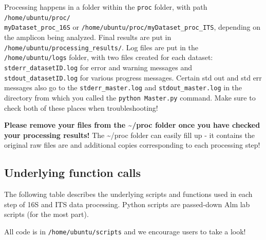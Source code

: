 \documentclass[11pt, oneside]{article}   	%
\begin{document}
Processing happens in a folder within the {\tt proc} folder, with path {\tt /home/ubuntu/proc/ \\ myDataset\_proc\_16S} or {\tt /home/ubuntu/proc/myDataset\_proc\_ITS}, depending on the amplicon being analyzed.  Final results are put in {\tt /home/ubuntu/processing\_results/}. Log files are put in the {\tt /home/ubuntu/logs} folder, with two files created for each dataset: {\tt stderr\_datasetID.log} for error and warning messages and {\tt stdout\_datasetID.log} for various progress messages. Certain std out and std err messages also go to
the \texttt{stderr\_master.log} and \texttt{stdout\_master.log} in the directory
from which you called the \texttt{python Master.py} command. Make sure to check
both of these places when troubleshooting! 

\textbf{Please remove your files from the \~{}/proc folder once you have checked your processing results!} The \~{}/proc folder can easily fill up - it contains the original raw files are and additional copies corresponding to each processing step!

\subsection{Underlying function calls}

The following table describes the underlying scripts and functions
used in each step of 16S and ITS data processing. Python scripts
are passed-down Alm lab scripts (for the most part).

All code is in \texttt{/home/ubuntu/scripts} and we encourage users
to take a look!
\end{document}
